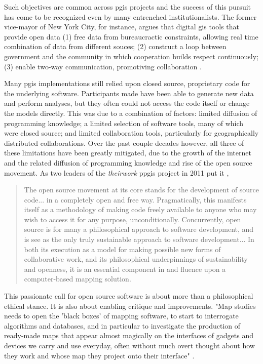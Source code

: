 Such objectives are common across \ac{pgis} projects and the success of this pursuit has come to be recognized even by many entrenched institutionalists. The former vice-mayor of New York City, for instance, argues that digital \ac{gis} tools that provide open data (1) free data from bureaucractic constraints, allowing real time combination of data from different souces; (2) construct a loop between government and the community in which cooperation builds respect continuously; (3) enable two-way communication, promotiving collaboration \cite{goldsmithResponsiveCityEngaging2014}.

Many \ac{pgis} implementations still relied upon closed source, proprietary code for the underlying software. Participants made have been able to generate new data and perform analyses, but they often could not access the code itself or change the models directly. This was due to a combination of factors: limited diffusion of programming knowledge; a limited selection of software tools, many of which were closed source; and limited collaboration tools, particularly for geographically distributed collaborations. Over the past couple decades however, all three of these limitations have been greatly mitigated, due to the growth of the internet and the related diffusion of programming knowledge and rise of the open source movement. As two leaders of the \textit{theirwork} \ac{ppgis} project in 2011 put it \cite{williamsonTheirworkDevelopmentSustainable2011}, 

\blockquote{The open source movement at its core stands for the development of source code... in a completely open and free way. Pragmatically, this manifests itself as a methodology of making code freely available to anyone who may wish to access it for any purpose, unconditionally. Concurrently, open source is for many a philosophical approach to software development, and is see as the only truly sustainable approach to software development... In both its execution as a model for making possible new forms of collaborative work, and its philosophical underpinnings of sustainability and openness, it is an essential component in and fluence upon a computer-based mapping solution.}

This passionate call for open source software is about more than a philosophical ethical stance. It is also about enabling critique and improvements. "Map studies needs to open the 'black boxes' of mapping software, to start to interrogate algorithms and databases, and in particular to investigate the production of ready-made maps that appear almost magically on the interfaces of gadgets and devices we carry and use everyday, often without much overt thought about how they work and whose map they project onto their interface" \cite{dodgeMappingModesMethods2011}.







